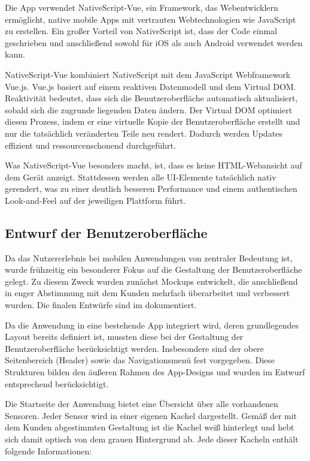 	Die App verwendet NativeScript-Vue, ein Framework, das Webentwicklern ermöglicht, native mobile Apps mit vertrauten Webtechnologien
	wie JavaScript zu erstellen. Ein großer Vorteil von NativeScript ist, dass der Code einmal geschrieben und anschließend
	sowohl für iOS als auch Android verwendet werden kann.

	NativeScript-Vue kombiniert NativeScript mit dem JavaScript Webframework Vue.js. Vue.js basiert auf einem reaktiven Datenmodell
	und dem Virtual DOM. Reaktivität bedeutet, dass sich die Benutzeroberfläche automatisch aktualisiert,
	sobald sich die zugrunde liegenden Daten ändern. Der Virtual DOM optimiert diesen Prozess, indem er eine virtuelle Kopie
	der Benutzeroberfläche erstellt und nur die tatsächlich veränderten Teile neu rendert. Dadurch werden Updates effizient und
	ressourcenschonend durchgeführt.

	Was NativeScript-Vue besonders macht, ist, dass es keine HTML-Webansicht auf dem Gerät anzeigt.
	Stattdessen werden alle UI-Elemente tatsächlich nativ gerendert, was zu einer deutlich besseren Performance
	und einem authentischen Look-and-Feel auf der jeweiligen Plattform führt.


\subsection{Entwurf der Benutzeroberfläche}
\label{sec:Benutzeroberflaeche}

	Da das Nutzererlebnis bei mobilen Anwendungen von zentraler Bedeutung ist,
	wurde frühzeitig ein besonderer Fokus auf die Gestaltung der Benutzeroberfläche gelegt.
	Zu diesem Zweck wurden zunächst Mockups entwickelt, die anschließend in enger Abstimmung mit dem Kunden mehrfach überarbeitet
	und verbessert wurden. Die finalen Entwürfe sind im  dokumentiert.

	Da die Anwendung in eine bestehende App integriert wird, deren grundlegendes Layout bereits definiert ist,
	mussten diese bei der Gestaltung der Benutzeroberfläche berücksichtigt werden.
	Insbesondere sind der obere Seitenbereich (Header) sowie das Navigationsmenü fest vorgegeben.
	Diese Strukturen bilden den äußeren Rahmen des App-Designs und wurden im Entwurf entsprechend berücksichtigt.

	Die Startseite der Anwendung bietet eine Übersicht über alle vorhandenen Sensoren.
	Jeder Sensor wird in einer eigenen Kachel dargestellt.
	Gemäß der mit dem Kunden abgestimmten Gestaltung ist die Kachel weiß hinterlegt und hebt sich damit optisch von dem grauen Hintergrund ab.
	Jede dieser Kacheln enthält folgende Informationen:

